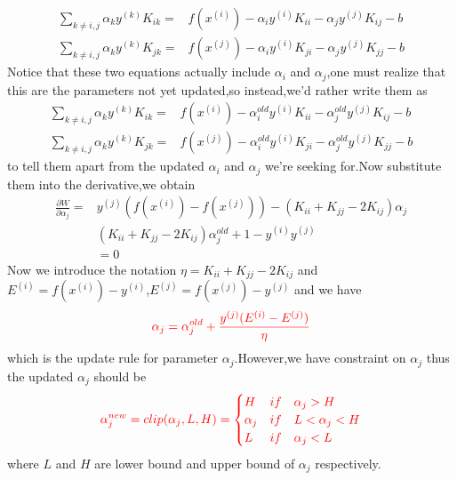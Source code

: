 \documentclass{article}
\begin{document}
\begin{align*}
	\underset{k\ne i,j}{\sum}\alpha_k y^{(k)}K_{ik}=&f(x^{(i)})-\alpha_i y^{(i)}K_{ii}-\alpha_j  y^{(j)}K_{ij}-b\\
	\underset{k\ne i,j}{\sum}\alpha_k y^{(k)}K_{jk}=&f(x^{(j)})-\alpha_i y^{(i)}K_{ji}-\alpha_j  y^{(j)}K_{jj}-b
\end{align*}
Notice that these two equations actually include $\alpha_i$ and $\alpha_j$,one must realize that this are the parameters not yet updated,so instead,we'd rather write them as
\begin{align*}
	\underset{k\ne i,j}{\sum}\alpha_k y^{(k)}K_{ik}=&f(x^{(i)})-\alpha_i^{old} y^{(i)}K_{ii}-\alpha_j^{old}  y^{(j)}K_{ij}-b\\
	\underset{k\ne i,j}{\sum}\alpha_k y^{(k)}K_{jk}=&f(x^{(j)})-\alpha_i^{old} y^{(i)}K_{ji}-\alpha_j^{old}  y^{(j)}K_{jj}-b
\end{align*}
to tell them apart from the updated $\alpha_i$ and $\alpha_j$ we're seeking for.Now substitute them into the derivative,we obtain
\begin{align*}
	\frac{\partial W}{\partial \alpha_j}=&y^{(j)}(f(x^{(i)})-f(x^{(j)}))-(K_{ii}+K_{jj}-2K_{ij})\alpha_j\\&(K_{ii}+K_{jj}-2K_{ij})\alpha_j^{old}+1-y^{(i)}y^{(j)}\\&=0
\end{align*}
Now we introduce the notation $\eta=K_{ii}+K_{jj}-2K_{ij}$ and $E^{(i)}=f(x^{(i)})-y^{(i)}$,$E^{(j)}=f(x^{(j)})-y^{(j)}$ and we have$$\textcolor{red}{\alpha_j=\alpha_j^{old}+\frac{y^{(j)}(E^{(i)}-E^{(j)})}{\eta}}$$which is the update rule for parameter $\alpha_j$.However,we have constraint on $\alpha_j$ thus the updated $\alpha_j$ should be
\begin{align*}
	\textcolor{red}{\alpha_j^{new}=clip(\alpha_j,L,H)=
	\begin{cases}
		H & if\quad\alpha_j > H\\
		\alpha_j & if\quad L < \alpha_j < H\\
		L & if\quad \alpha_j < L
	\end{cases}}
\end{align*}
where $L$ and $H$ are lower bound and upper bound of $\alpha_j$ respectively.
\end{document}

